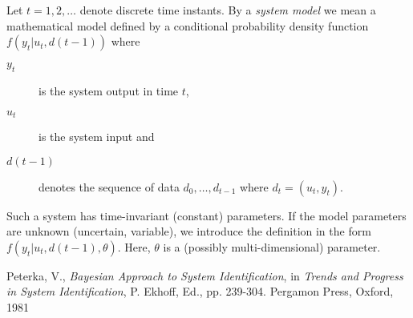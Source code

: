 \documentclass[12pt]{article}
\begin{document}
Let $t = 1, 2,\ldots$ denote discrete time instants. By a {\it system model} we mean a mathematical model defined by a conditional probability density function $f(y_{t}|u_{t}, d(t-1))$ where
\begin{description}
  \item [$y_{t}$] is the system output in time $t$,
  \item [$u_{t}$] is the system input and 
  \item [$d(t-1)$] denotes the sequence of data $d_{0}, \ldots, d_{t-1}$ where $d_{t} = (u_{t}, y_{t})$.
\end{description}
Such a system has time-invariant (constant) parameters. 
If the model parameters are unknown (uncertain, variable), we introduce the definition in the form $f(y_{t}|u_{t}, d(t-1), \theta)$. Here, $\theta$ is a (possibly multi-dimensional) parameter.

\begin{thebibliography}{99}
    Peterka, V., \emph{Bayesian Approach to System Identification}, in \emph{Trends and Progress in System Identification}, P. Ekhoff, Ed., pp. 239-304. Pergamon Press, Oxford, 1981
\end{thebibliography}
\end{document}
